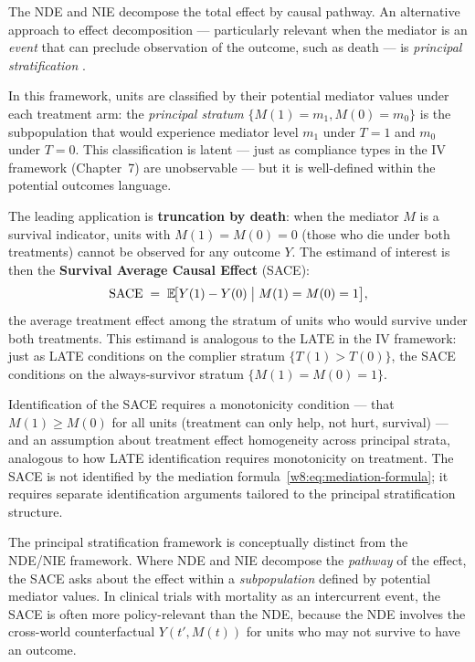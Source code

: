 \documentclass[master.tex]{subfiles}
\begin{document}
\begin{remark}
\label{w8:rem:sace}
The NDE and NIE decompose the total effect by causal pathway.  An
alternative approach to effect decomposition --- particularly relevant
when the mediator is an \emph{event} that can preclude observation of
the outcome, such as death --- is \emph{principal stratification}
\citep{frangakis2002principal}.

In this framework, units are classified by their potential mediator
values under each treatment arm: the \emph{principal stratum}
$\{M(1) = m_1, M(0) = m_0\}$ is the subpopulation that would
experience mediator level $m_1$ under $T=1$ and $m_0$ under $T=0$.
This classification is latent --- just as compliance types in the IV
framework (Chapter~7) are unobservable --- but it is well-defined
within the potential outcomes language.

The leading application is \textbf{truncation by death}: when the
mediator $M$ is a survival indicator, units with $M(1) = M(0) = 0$
(those who die under both treatments) cannot be observed for any
outcome $Y$.  The estimand of interest is then the
\textbf{Survival Average Causal Effect} (SACE):
\[
  \mathrm{SACE}
  \;=\;
  \mathbb{E}\!\bigl[Y(1) - Y(0) \;\big|\; M(1) = M(0) = 1\bigr],
\]
the average treatment effect among the stratum of units who would
survive under both treatments.  This estimand is analogous to the LATE
in the IV framework: just as LATE conditions on the complier stratum
$\{T(1) > T(0)\}$, the SACE conditions on the always-survivor stratum
$\{M(1) = M(0) = 1\}$.

Identification of the SACE requires a monotonicity condition --- that
$M(1) \geq M(0)$ for all units (treatment can only help, not hurt,
survival) --- and an assumption about treatment effect homogeneity
across principal strata, analogous to how LATE identification requires
monotonicity on treatment.  The SACE is not identified by the mediation
formula~\eqref{w8:eq:mediation-formula}; it requires separate
identification arguments tailored to the principal stratification
structure.

The principal stratification framework is conceptually distinct from
the NDE/NIE framework.  Where NDE and NIE decompose the \emph{pathway}
of the effect, the SACE asks about the effect within a
\emph{subpopulation} defined by potential mediator values.  In clinical
trials with mortality as an intercurrent event, the SACE is often more
policy-relevant than the NDE, because the NDE involves the cross-world
counterfactual $Y(t', M(t))$ for units who may not survive to have an
outcome.
\end{remark}
\end{document}
